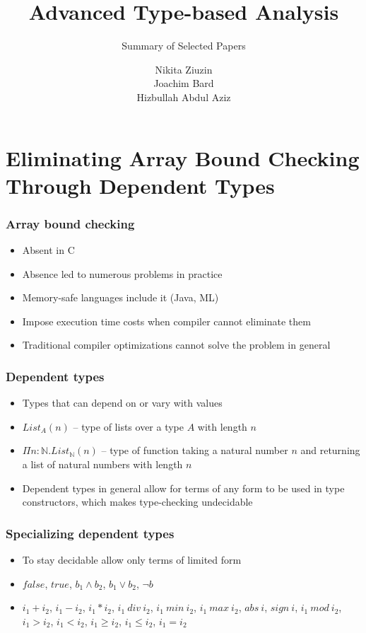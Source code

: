 \documentclass[pdf]{beamer}
\title{Advanced Type-based Analysis}
\subtitle{Summary of Selected Papers}
\author[Nikita Ziuzin, Joachim Bard, Hizbullah Abdul Aziz]{Nikita Ziuzin\\
        Joachim Bard\\
        Hizbullah Abdul Aziz}
\begin{document}
\begin{frame}
  \titlepage
\end{frame}

\section{Eliminating Array Bound Checking Through Dependent Types}

\begin{frame}
  \frametitle{Array bound checking}

  \begin{itemize}
    \item Absent in C
    \item Absence led to numerous problems in practice
    \item Memory-safe languages include it (Java, ML)
    \item Impose execution time costs when compiler cannot eliminate them
    \item Traditional compiler optimizations cannot solve the problem in general
  \end{itemize}
\end{frame}

\begin{frame}
  \frametitle{Dependent types}

  \begin{itemize}
    \item Types that can depend on or vary with values
    \item $\mathit{List_A}(n)$ -- type of lists over a type $A$ with length $n$
    \item $\Pi n : \mathbb{N}.List_\mathbb{N}(n)$ -- type of function taking a
      natural number $n$ and returning a list of natural numbers with length
      $n$
    \item Dependent types in general allow for terms of any form to be used in
      type constructors, which makes type-checking undecidable
  \end{itemize}
\end{frame}

\begin{frame}
  \frametitle{Specializing dependent types}

  \begin{itemize}
    \item To stay decidable allow only terms of limited form
    \item $false$, $true$, $b_1 \land b_2$, $b_1 \lor b_2$, $\neg b$
    \item $i_1 + i_2$, $i_1 - i_2$, $i_1 * i_2$, $i_1~div~i_2$, $i_1~min~i_2$,
      $i_1~max~i_2$, $abs~i$, $sign~i$, $i_1~mod~i_2$, $i_1 > i_2$, $i_1 <
      i_2$, $i_1 \ge i_2$, $i_1 \le i_2$, $i_1 = i_2$
  \end{itemize}
\end{frame}
\end{document}
